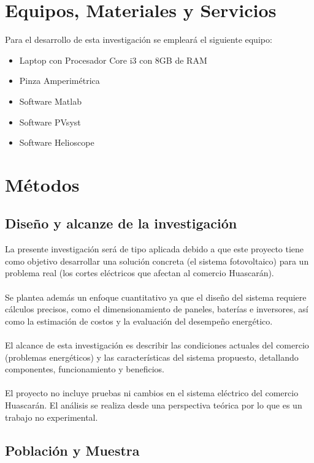 \section{Equipos, Materiales y Servicios}

Para el desarrollo de esta investigación se empleará el siguiente equipo:

\begin{itemize}
  \item Laptop con Procesador Core i3 con 8GB de RAM
  \item Pinza Amperimétrica
  \item Software Matlab
  \item Software PVsyst
  \item Software Helioscope
\end{itemize}

\section{Métodos}
\subsection{Diseño y alcanze de la investigación}

La presente investigación será de tipo aplicada debido a que este proyecto tiene como objetivo desarrollar una solución concreta (el sistema fotovoltaico) para un problema real (los cortes eléctricos que afectan al comercio Huascarán).
\\
\\
Se plantea además un enfoque cuantitativo ya que el diseño del sistema requiere cálculos precisos, como el dimensionamiento de paneles, baterías e inversores, así como la estimación de costos y la evaluación del desempeño energético.
\\
\\
El alcance de esta investigación es describir las condiciones actuales del comercio (problemas energéticos) y las características del sistema propuesto, detallando componentes, funcionamiento y beneficios.
\\
\\
El proyecto no incluye pruebas ni cambios en el sistema eléctrico del comercio Huascarán. El análisis se realiza desde una perspectiva teórica por lo que es un trabajo no experimental.

\subsection{Población y Muestra}

